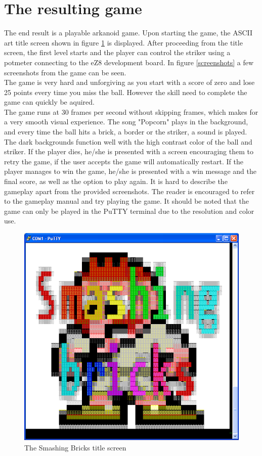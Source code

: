 
\section{The resulting game}
The end result is a playable arkanoid game. Upon starting the game, the ASCII art title screen
shown in figure \ref{title} is displayed. After proceeding from the title screen, the first
level starts and the player can control the striker using a potmeter connecting to the eZ8
development board. In figure \ref{screenshots} a few screenshots from the game can be seen. \\

The game is very hard and unforgiving as you start with a score of zero and lose 25 points every
time you miss the ball. However the skill need to complete the game can quickly be
aquired. \\

The game runs at 30 frames per second without skipping frames, which makes for a very
smooth visual experience. The song "Popcorn" plays in the background, and every time
the ball hits a brick, a border or the striker, a sound is played.
 The dark backgrounds function well with the high contrast
color of the ball and striker. If the player dies, he/she is presented with a screen
encouraging them to retry the game, if the user accepts the game will automatically restart.
If the player manages to win the game, he/she is presented with a win message and the final
score, as well as the option to play again.  It is hard to describe the gameplay apart from the
provided screenshots. The reader is encouraged to refer to the gameplay manual and
try playing the game. It should be noted that the game can only be played in the PuTTY terminal
due to the resolution and color use.

\begin{figure}
	\center
	\includegraphics[scale=0.5]{pictures/title_screen.PNG}
	\caption{The Smashing Bricks title screen}
	\label{title}
\end{figure}

